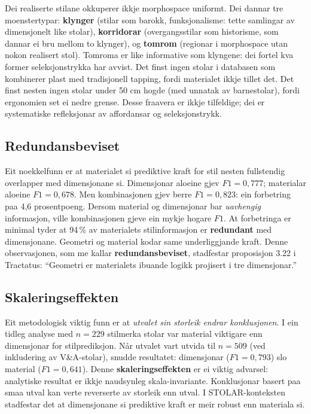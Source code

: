 \documentclass[10pt, a4paper, twocolumn]{article}
\begin{document}
Dei realiserte stilane okkuperer ikkje morphospace uniformt. Dei dannar tre moenstertypar: \textbf{klynger} (stilar som barokk, funksjonalisme: tette samlingar av dimensjonelt like stolar), \textbf{korridorar} (overgangsstilar som historisme, som dannar ei bru mellom to klynger), og \textbf{tomrom} (regionar i morphospace utan nokon realisert stol). Tomroma er like informative som klyngene: dei fortel kva former seleksjonstrykka har avvist. Det finst ingen stolar i databasen som kombinerer plast med tradisjonell tapping, fordi materialet ikkje tillet det. Det finst nesten ingen stolar under 50 cm hogde (med unnatak av barnestolar), fordi ergonomien set ei nedre grense. Desse fraavera er ikkje tilfeldige; dei er systematiske refleksjonar av affordansar og seleksjonstrykk.

\subsection{Redundansbeviset}

Eit noekkelfunn er at materialet si prediktive kraft for stil nesten fullstendig overlapper med dimensjonane si. Dimensjonar aloeine gjev $F1 = 0{,}777$; materialar aloeine $F1 = 0{,}678$. Men kombinasjonen gjev berre $F1 = 0{,}823$: ein forbetring paa 4,6 prosentpoeng. Dersom material og dimensjonar bar \emph{uavhengig} informasjon, ville kombinasjonen gjeve ein mykje hogare $F1$. At forbetringa er minimal tyder at 94\,\% av materialets stilinformasjon er \textbf{redundant} med dimensjonane. Geometri og material kodar same underliggjande kraft. Denne observasjonen, som me kallar \textbf{redundansbeviset}, stadfestar proposisjon 3.22 i Tractatus: ``Geometri er materialets ibuande logikk projisert i tre dimensjonar.''

\subsection{Skaleringseffekten}

Eit metodologisk viktig funn er at \emph{utvalet sin storleik endrar konklusjonen}. I ein tidleg analyse med $n = 229$ stilmerka stolar var material viktigare enn dimensjonar for stilprediksjon. Når utvalet vart utvida til $n = 509$ (ved inkludering av V\&A-stolar), snudde resultatet: dimensjonar ($F1 = 0{,}793$) slo material ($F1 = 0{,}641$). Denne \textbf{skaleringseffekten} er ei viktig advarsel: analytiske resultat er ikkje naudsynleg skala-invariante. Konklusjonar basert paa smaa utval kan verte reverserte av storleik enn utval. I STOLAR-konteksten stadfestar det at dimensjonane si prediktive kraft er meir robust enn materiala si.
\end{document}
